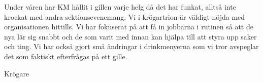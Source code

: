 \documentclass[../_main/handlingar.tex]{subfiles}
\begin{document}
Under våren har KM hållit i gillen varje helg då det har funkat, alltså inte krockat med andra sektionsevenemang. Vi i krögartrion är väldigt nöjda med organisationen hittills. Vi har fokuserat på att få in jobbarna i rutinen så att de nya lär sig snabbt och de som varit med innan kan hjälpa till att styra upp saker och ting. Vi har också gjort små ändringar i drinkmenyerna som vi tror avspeglar det som faktiskt efterfrågas på ett gille.
\begin{signatures}{1}
    \mvh
    \signature{Malin Heyden}{Krögare}
\end{signatures}
\end{document}
